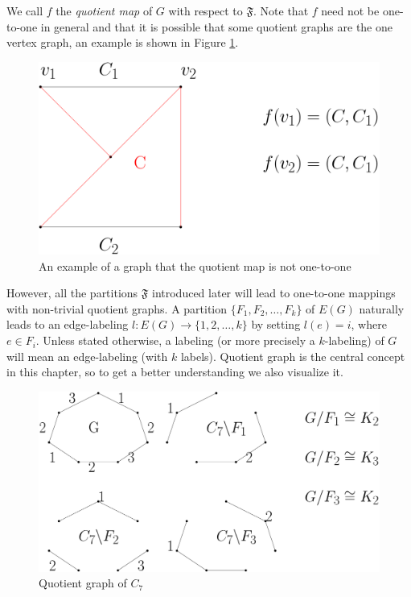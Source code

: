 \documentclass[12pt,a4paper,titlepage,openany]{report}
\begin{document}
We call $f$ the \textit{quotient map} of $G$ with respect to $\mathfrak{F}$. Note that $f$ need not be one-to-one in general and that it is possible that some quotient graphs are the one vertex graph, an example is shown in Figure \ref{fnotonetoone}.
\begin{figure}[h]\label{fnotonetoone}
\begin{center}
\includegraphics[width=0.8\linewidth]{figures/fnotonetoone.png}
\end{center}
\caption{An example of a graph that the quotient map is not one-to-one}
\end{figure}
 However, all the partitions $\mathfrak{F}$ introduced later will lead to one-to-one mappings with non-trivial quotient graphs.\newline
A partition $\{F_1,F_2,\ldots ,F_k\}$ of $E(G)$ naturally leads to an edge-labeling $l:E(G)\to \{1,2,\ldots,k\}$ by setting $l(e)=i$, where $e\in F_i$. Unless stated
otherwise, a labeling (or more precisely a $k$-labeling) of $G$ will mean an edge-labeling (with $k$ labels).
\newline 
Quotient graph is the central concept in this chapter, so to get a better understanding we also visualize it.
\begin{figure}[h!]
\begin{center}
\includegraphics[width=1\linewidth]{figures/quotientgraph.png}
\end{center}
\caption{Quotient graph of $C_7$}
\end{figure}
\end{document}
